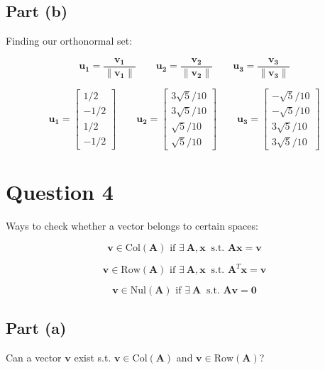 \documentclass{article}
\begin{document}
\subsection{Part (b)} 
Finding our orthonormal set:


\[%
    \mathbf{u_1}
    =
    \frac{\mathbf{v_1}}{\|\mathbf{v_1}\|}
    \qquad
    \mathbf{u_2}
    =
    \frac{\mathbf{v_2}}{\|\mathbf{v_2}\|}
    \qquad
    \mathbf{u_3}
    =
    \frac{\mathbf{v_3}}{\|\mathbf{v_3}\|}
\]%

\[%
    \mathbf{u_1}
    =
    \begin{bmatrix}1/2\\-1/2\\1/2\\-1/2\end{bmatrix}
    \qquad
    \mathbf{u_2}
    =
    \begin{bmatrix}3\sqrt{5}/10\\3\sqrt{5}/10\\\sqrt{5}/10\\\sqrt{5}/10\end{bmatrix}
    \qquad
    \mathbf{u_3}
    =
    \begin{bmatrix}-\sqrt{5}/10\\-\sqrt{5}/10\\3\sqrt{5}/10\\3\sqrt{5}/10\end{bmatrix}    
\]%

\clearpage
\section{Question 4} 
Ways to check whether a vector belongs to certain spaces:

\[%
    \mathbf{v} \in  \text{Col}(\mathbf{A}) \text{ if } 
    \exists \ \mathbf{A} , \mathbf{x} \ \text{  s.t. }
    \mathbf{A}\mathbf{x}
    =
    \mathbf{v}
\]%

\[%
    \mathbf{v} \in \text{Row}(\mathbf{A}) \text{ if } 
    \exists \ \mathbf{A} , \mathbf{x} \ \text{ s.t. }
    \mathbf{A}^{T}\mathbf{x}
    =
    \mathbf{v}
\]%

\[%
    \mathbf{v} \in \text{Nul}(\mathbf{A}) \text{ if } 
    \exists \ \mathbf{A} \ \text{ s.t. }
    \mathbf{A}\mathbf{v}
    =
    \mathbf{0}
\]%
\subsection{Part (a)} 
Can a vector $\mathbf{v}$ exist s.t. $\mathbf{v} \in \text{Col}(\mathbf{A})$ and
$\mathbf{v} \in \text{Row}(\mathbf{A})$?
\end{document}
